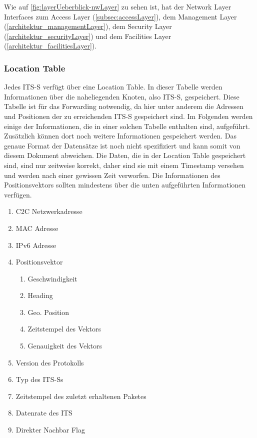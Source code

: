 Wie auf \autoref{fig:layerUeberblick-nwLayer} zu sehen ist, hat der Network Layer Interfaces zum Access Layer (\autoref{subsec:accessLayer}), dem Management Layer (\autoref{architektur_managementLayer}), dem Security Layer (\autoref{architektur_securityLayer}) und dem Facilities Layer (\autoref{architektur_facilitiesLayer}).

\subsubsection{Location Table}
Jedes \ac{ITS-S} verfügt über eine Location Table. In dieser Tabelle werden Informationen über die naheliegenden Knoten, also \ac{ITS-S}, gespeichert. Diese Tabelle ist für das Forwarding notwendig, da hier unter anderem die Adressen und Positionen der zu erreichenden \ac{ITS-S} gespeichert sind. 
Im Folgenden werden einige der Informationen, die in einer solchen Tabelle enthalten sind, aufgeführt. Zusätzlich können dort noch weitere Informationen  gespeichert werden. Das genaue Format der Datensätze ist noch nicht spezifiziert und kann somit von diesem Dokument abweichen. Die Daten, die in der Location Table gespeichert sind, sind nur zeitweise korrekt, daher sind sie mit einem Timestamp versehen und werden nach einer gewissen Zeit verworfen. Die Informationen des Positionsvektors sollten mindestens über die unten aufgeführten Informationen verfügen. 
\begin{enumerate}
      \item C2C Netzwerkadresse
      \item MAC Adresse
      \item IPv6 Adresse
      \item Positionsvektor
      \begin{enumerate}
      	\item Geschwindigkeit
	\item Heading
	\item Geo. Position
	\item Zeitstempel des Vektors
	\item Genauigkeit des Vektors
      \end{enumerate}
      \item Version des Protokolls
      \item Typ des \ac{ITS-S}s
      \item Zeitstempel des zuletzt erhaltenen Paketes
      \item Datenrate des ITS
      \item Direkter Nachbar Flag
\end{enumerate}

